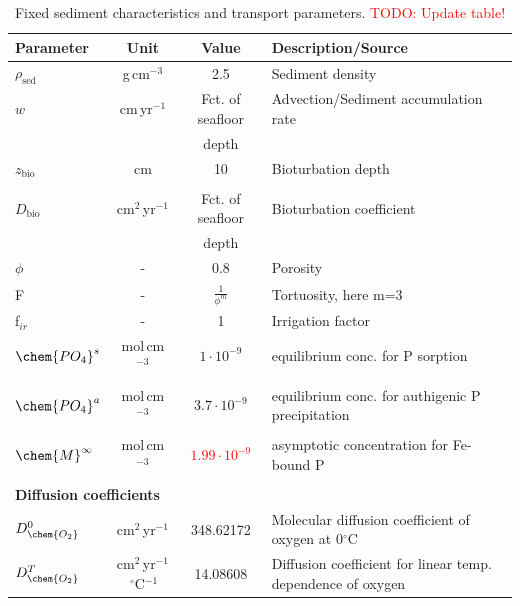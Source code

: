\documentclass[gmd, manuscript]{copernicus}
\begin{document}
\begin{table}[hbtp]
\caption{Fixed sediment characteristics and transport parameters. \textcolor{red}{TODO: Update table!}}
\centering
\begin{tabular}{l c c l}
\hline\hline
Parameter & Unit  & Value & Description/Source\\
\hline
$\rho_{\mathrm{sed}}$ & g\,cm$^{-3}$ & 2.5 & Sediment density \\
$w$ & cm\,yr$^{-1}$ &  Fct. of seafloor  & Advection/Sediment accumulation rate \\
&& depth & \citet{middelburg_empirical_1997}\\
$z_{\mathrm{bio}}$& cm & 10 & Bioturbation depth\\
&&&\citet{boudreau_mean_1998, teal_global_2010}\\
$D_{\mathrm{bio}}$& cm$^2$\,yr$^{-1}$ & Fct. of seafloor & Bioturbation coefficient\\
&& depth &\citet{middelburg_empirical_1997}\\
$\phi$ & - & 0.8 & Porosity\\
F & - &  $\frac{1}{\phi^m}$ & Tortuosity, here m=3\\
f$_{ir}$ & - & 1 & Irrigation factor\\
$\chem{PO_4}^s$ & mol\,cm$^{-3}$ & $1\cdot 10^{-9}$ & equilibrium conc. for P sorption\\
&&&\citet{caroline_p_slomp_key_1996}\\
$\chem{PO_4}^a$ & mol\,cm$^{-3}$ & $3.7\cdot 10^{-9}$ & equilibrium conc. for authigenic P precipitation\\
&&&\citet{caroline_p_slomp_key_1996}\\
$\chem{M}^\infty$ & mol\,cm$^{-3}$ & \textcolor{red}{$1.99\cdot 10^{-9}$} & asymptotic concentration for Fe-bound P\\
&&&\citet{caroline_p_slomp_key_1996}\\
\multicolumn{4}{l}{\textbf{Diffusion coefficients} \citep{Li_diffusion_1974, gypens_simple_2008}}\\
$D_{\chem{O_2}}^0$ & cm$^2$\,yr$^{-1}$ & 348.62172 &Molecular diffusion coefficient of oxygen at 0$^\circ$C\\
$D_{\chem{O_2}}^T$ & cm$^2$\,yr$^{-1}$\,${}^{\circ}$C$^{-1}$ & 14.08608 &Diffusion coefficient for linear temp. dependence of oxygen\\ %

\end{tabular}
\end{table}
\end{document}
